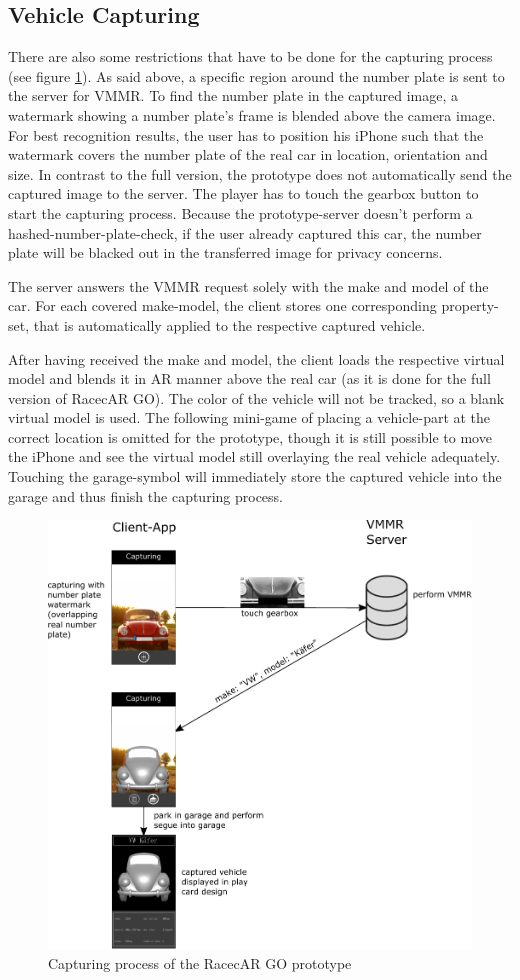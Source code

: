 \subsection{Vehicle Capturing}\label{sec:vehicleCapturingProto}
There are also some restrictions that have to be done for the capturing process (see figure \ref{fig:capturingLimited}). As said above, a specific region around the number plate is sent to the server for VMMR. To find the number plate in the captured image, a watermark showing a number plate's frame is blended above the camera image. For best recognition results, the user has to position his iPhone such that the watermark covers the number plate of the real car in location, orientation and size. In contrast to the full version, the prototype does not automatically send the captured image to the server. The player has to touch the gearbox button to start the capturing process. Because the prototype-server doesn't perform a hashed-number-plate-check, if the user already captured this car, the number plate will be blacked out in the transferred image for privacy concerns.

The server answers the VMMR request solely with the make and model of the car. For each covered make-model, the client stores one corresponding property-set, that is automatically applied to the respective captured vehicle.

After having received the make and model, the client loads the respective virtual model and blends it in AR manner above the real car (as it is done for the full version of RacecAR GO). The color of the vehicle will not be tracked, so a blank virtual model is used. The following mini-game of placing a vehicle-part at the correct location is omitted for the prototype, though it is still possible to move the iPhone and see the virtual model still overlaying the real vehicle adequately. Touching the garage-symbol will immediately store the captured vehicle into the garage and thus finish the capturing process.

\begin{figure}[btph]
  \centering
        \includegraphics[width=.75\linewidth]{gfx/capturing_limited}
        \caption{Capturing process of the RacecAR GO prototype}
        \label{fig:capturingLimited}
\end{figure}

